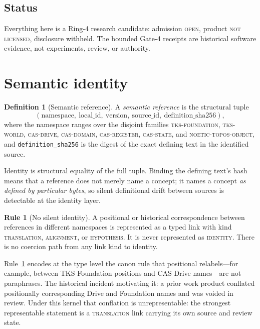 \documentclass[11pt]{amsart}
\theoremstyle{definition}
\newtheorem{definition}[theorem]{Definition}
\newtheorem{ruleenv}[theorem]{Rule}
\theoremstyle{remark}
\begin{document}
\subsection{Status}
Everything here is a Ring-4 research candidate: admission \textsc{open}, product \textsc{not licensed}, disclosure withheld. The bounded Gate-4 receipts are historical software evidence, not experiments, review, or authority.

\section{Semantic identity}\label{sec:identity}

\begin{definition}[Semantic reference]\label{def:semref}
A \emph{semantic reference} is the structural tuple
\[
(\text{namespace},\ \text{local\_id},\ \text{version},\ \text{source\_id},\ \text{definition\_sha256}),
\]
where the namespace ranges over the disjoint families \textsc{tks-foundation}, \textsc{tks-world}, \textsc{cas-drive}, \textsc{cas-domain}, \textsc{cas-register}, \textsc{cas-state}, and \textsc{noetic-topos-object}, and \texttt{definition\_sha256} is the digest of the exact defining text in the identified source.
\end{definition}

Identity is structural equality of the full tuple. Binding the defining text's hash means that a reference does not merely name a concept; it names a concept \emph{as defined by particular bytes}, so silent definitional drift between sources is detectable at the identity layer.

\begin{ruleenv}[No silent identity]\label{rule:noid}
A positional or historical correspondence between references in different namespaces is represented as a typed link with kind \textsc{translation}, \textsc{alignment}, or \textsc{hypothesis}. It is never represented as \textsc{identity}. There is no coercion path from any link kind to identity.
\end{ruleenv}

Rule~\ref{rule:noid} encodes at the type level the canon rule that positional relabels---for example, between TKS Foundation positions and CAS Drive names---are not paraphrases. The historical incident motivating it: a prior work product conflated positionally corresponding Drive and Foundation names and was voided in review. Under this kernel that conflation is unrepresentable: the strongest representable statement is a \textsc{translation} link carrying its own source and review state.
\end{document}

